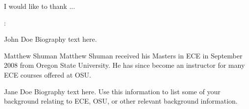 \documentclass[journal]{IEEEtran}
\begin{document}
I would like to thank ...


%

 

% 
:

\begin{biography}{John Doe}
Biography text here.
\end{biography}

\begin{IEEEbiographynophoto}{Matthew Shuman}
Matthew Shuman received his Masters in ECE in September 2008 from Oregon State University.  He has since become an instructor for many ECE courses offered at OSU.
\end{IEEEbiographynophoto}


\begin{IEEEbiographynophoto}{Jane Doe}
Biography text here.  Use this information to list some of your background relating to ECE, OSU, or other relevant background information.
\end{IEEEbiographynophoto}






\end{document}
